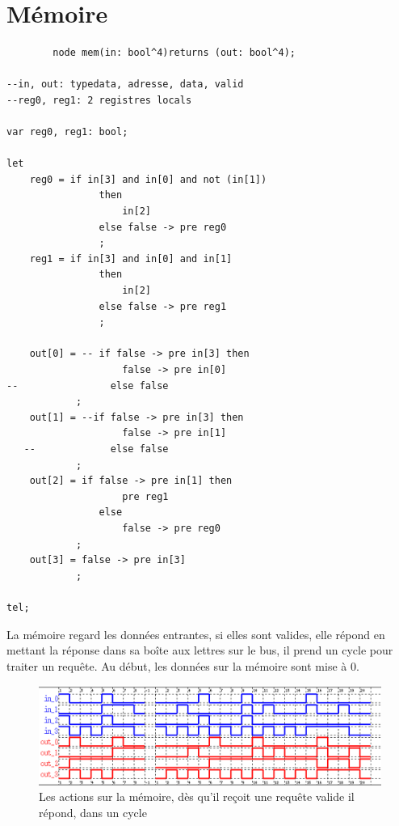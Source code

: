 \documentclass[a4paper,11pt]{report}
\begin{document}
\chapter{Mémoire}
	\begin{framed}
		\begin{verbatim}
		node mem(in: bool^4)returns (out: bool^4);

--in, out: typedata, adresse, data, valid
--reg0, reg1: 2 registres locals

var reg0, reg1: bool;

let
    reg0 = if in[3] and in[0] and not (in[1])
                then
                    in[2]
                else false -> pre reg0
                ;
    reg1 = if in[3] and in[0] and in[1]
                then
                    in[2]
                else false -> pre reg1
                ;

    out[0] = -- if false -> pre in[3] then
                    false -> pre in[0]
--                else false
            ;
    out[1] = --if false -> pre in[3] then
                    false -> pre in[1]
   --             else false
            ;
    out[2] = if false -> pre in[1] then
                    pre reg1
                else
                    false -> pre reg0
            ;
    out[3] = false -> pre in[3]
            ;

tel;

		\end{verbatim}
	\end{framed}
	
	La mémoire regard les données entrantes, si elles sont valides, elle répond en mettant la réponse dans sa boîte aux lettres sur le bus, il prend un cycle pour traiter un requête. Au début, les données sur la mémoire sont mise à 0.
	
	\begin{figure}[!htbp]	
		\includegraphics[width = 16cm]{mem_diag_1.png}
		\caption{Les actions sur la mémoire, dès qu'il reçoit une requête valide il répond, dans un cycle}
	\end{figure}
	
\end{document}
